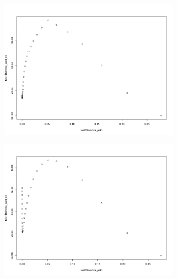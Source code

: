 \documentclass[letterpaper]{article}
\begin{document}
\begin{figure}[H]
\centering
\begin{subfigure}{0.5\textwidth}
  \centering
  \includegraphics[width=1\linewidth]{./result_plot/cv_square/7wrong_path_plot}
\end{subfigure}%
\begin{subfigure}{.5\textwidth}
  \centering
  \includegraphics[width=1\linewidth]{./result_plot/cv_square/8wrong_path_plot}
\end{subfigure}

\end{figure}
\end{document}
